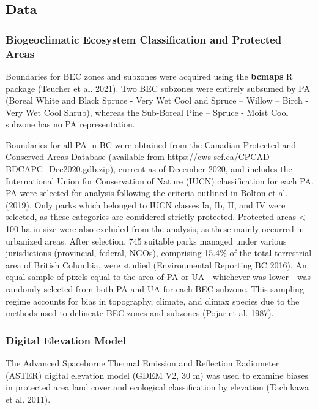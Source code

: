 \documentclass[10pt,oneside]{article}
\begin{document}
\hypertarget{data}{%
\subsection{Data}\label{data}}

\hypertarget{biogeoclimatic-ecosystem-classification-and-protected-areas}{%
\subsubsection{Biogeoclimatic Ecosystem Classification and Protected
Areas}\label{biogeoclimatic-ecosystem-classification-and-protected-areas}}

Boundaries for BEC zones and subzones were acquired using the
\textbf{bcmaps} R package (Teucher et al. 2021). Two BEC subzones were
entirely subsumed by PA (Boreal White and Black Spruce - Very Wet Cool
and Spruce -- Willow -- Birch - Very Wet Cool Shrub), whereas the
Sub-Boreal Pine -- Spruce - Moist Cool subzone has no PA representation.

Boundaries for all PA in BC were obtained from the Canadian Protected
and Conserved Areas Database (available from
\url{https://cws-scf.ca/CPCAD-BDCAPC_Dec2020.gdb.zip}), current as of
December 2020, and includes the International Union for Conservation of
Nature (IUCN) classification for each PA. PA were selected for analysis
following the criteria outlined in Bolton et al. (2019). Only parks
which belonged to IUCN classes Ia, Ib, II, and IV were selected, as
these categories are considered strictly protected. Protected areas
\textless{} 100 ha in size were also excluded from the analysis, as
these mainly occurred in urbanized areas. After selection, 745 suitable
parks managed under various jurisdictions (provincial, federal, NGOs),
comprising 15.4\% of the total terrestrial area of British Columbia,
were studied (Environmental Reporting BC 2016). An equal sample of
pixels equal to the area of PA or UA - whichever was lower - was
randomly selected from both PA and UA for each BEC subzone. This
sampling regime accounts for bias in topography, climate, and climax
species due to the methods used to delineate BEC zones and subzones
(Pojar et al. 1987).

\hypertarget{digital-elevation-model}{%
\subsubsection{Digital Elevation Model}\label{digital-elevation-model}}

The Advanced Spaceborne Thermal Emission and Reflection Radiometer
(ASTER) digital elevation model (GDEM V2, 30 m) was used to examine
biases in protected area land cover and ecological classification by
elevation (Tachikawa et al. 2011).
\end{document}
